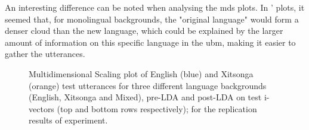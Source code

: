 \par An interesting difference can be noted when analysing the \acrshort{mds} plots. In \citet{carbajal2016language}' plots, it seemed that, for monolingual backgrounds, the "original language" would form a denser cloud than the new language, which could be explained by the larger amount of information on this specific language in the \acrshort{ubm}, making it easier to gather the utterances. 

\begin{figure}[h!]
\caption{Multidimensional Scaling plot of English (blue) and Xitsonga (orange) test utterances for three different language backgrounds (English, Xitsonga and Mixed), pre-LDA and post-LDA on test i-vectors (top and bottom rows respectively); for the replication results of \citet{carbajal2016language} experiment.}
\label{Figure: Julia Replication MDS}
\end{figure}
\bigskip 
{}

\bigskip
\par \noindent {}



